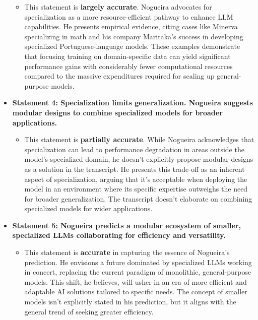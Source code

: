 \documentclass[
]{article}
\begin{document}
\begin{itemize}
\begin{itemize}
  \item
    This statement is \textbf{largely accurate}. Nogueira advocates for
    specialization as a more resource-efficient pathway to enhance LLM
    capabilities. He presents empirical evidence, citing cases like
    Minerva specializing in math and his company Maritaka's success in
    developing specialized Portuguese-language models. These examples
    demonstrate that focusing training on domain-specific data can yield
    significant performance gains with considerably fewer computational
    resources compared to the massive expenditures required for scaling
    up general-purpose models.
  \end{itemize}
\item
  \textbf{Statement 4: Specialization limits generalization. Nogueira
  suggests modular designs to combine specialized models for broader
  applications.}

  \begin{itemize}
  
  \item
    This statement is \textbf{partially accurate}. While Nogueira
    acknowledges that specialization can lead to performance degradation
    in areas outside the model's specialized domain, he doesn't
    explicitly propose modular designs as a solution in the transcript.
    He presents this trade-off as an inherent aspect of specialization,
    arguing that it's acceptable when deploying the model in an
    environment where its specific expertise outweighs the need for
    broader generalization. The transcript doesn't elaborate on
    combining specialized models for wider applications.
  \end{itemize}
\item
  \textbf{Statement 5: Nogueira predicts a modular ecosystem of smaller,
  specialized LLMs collaborating for efficiency and versatility.}

  \begin{itemize}
  
  \item
    This statement is \textbf{accurate} in capturing the essence of
    Nogueira's prediction. He envisions a future dominated by
    specialized LLMs working in concert, replacing the current paradigm
    of monolithic, general-purpose models. This shift, he believes, will
    usher in an era of more efficient and adaptable AI solutions
    tailored to specific needs. The concept of smaller models isn't
    explicitly stated in his prediction, but it aligns with the general
    trend of seeking greater efficiency.
  \end{itemize}
\end{itemize}
\end{document}
